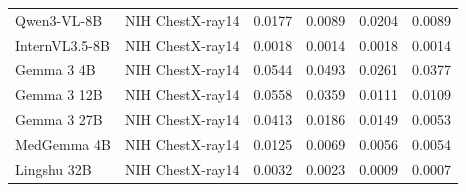 \documentclass{article}
\providecommand{\DIFaddendFL}{} %
\DeclareRobustCommand{\DIFaddendFL}{\DIFOaddendFL \let\includegraphics\DIFOincludegraphics} %
\begin{document}
\begin{table}[h]
{\begin{tabular}{llrrrr}
Qwen3-VL-8B & NIH ChestX-ray14 & 0.0177 & 0.0089 & 0.0204 & 0.0089 \\
InternVL3.5-8B & NIH ChestX-ray14 & 0.0018 & 0.0014 & 0.0018 & 0.0014 \\
Gemma 3 4B & NIH ChestX-ray14 & 0.0544 & 0.0493 & 0.0261 & 0.0377 \\
Gemma 3 12B & NIH ChestX-ray14 & 0.0558 & 0.0359 & 0.0111 & 0.0109 \\
Gemma 3 27B & NIH ChestX-ray14 & 0.0413 & 0.0186 & 0.0149 & 0.0053 \\
MedGemma 4B & NIH ChestX-ray14 & 0.0125 & 0.0069 & 0.0056 & 0.0054 \\
Lingshu 32B & NIH ChestX-ray14 & 0.0032 & 0.0023 & 0.0009 & 0.0007 \\
\bottomrule
\end{tabular}}
\DIFaddendFL \end{table}
\end{document}
